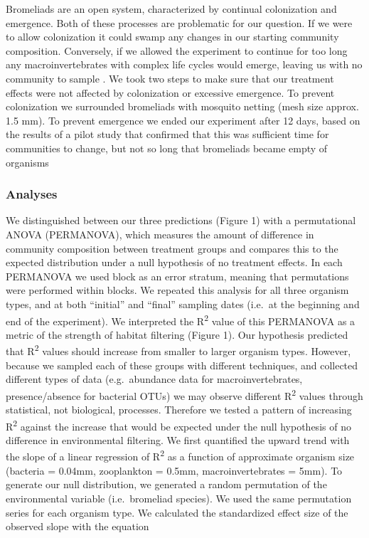 Bromeliads are an open system, characterized by continual colonization
and emergence. Both of these processes are problematic for our question.
If we were to allow colonization it could swamp any changes in our
starting community composition. Conversely, if we allowed the experiment
to continue for too long any macroinvertebrates with complex life cycles
would emerge, leaving us with no community to sample \citep{Lecraw2014}.
We took two steps to make sure that our treatment effects were not
affected by colonization or excessive emergence. To prevent colonization
we surrounded bromeliads with mosquito netting (mesh size approx. 1.5
mm). To prevent emergence we ended our experiment after 12 days, based
on the results of a pilot study that confirmed that this was sufficient
time for communities to change, but not so long that bromeliads became
empty of organisms

\subsubsection{Analyses}\label{analyses}

We distinguished between our three predictions (Figure 1) with a
permutational ANOVA (PERMANOVA), which measures the amount of difference
in community composition between treatment groups and compares this to
the expected distribution under a null hypothesis of no treatment
effects. In each PERMANOVA we used block as an error stratum, meaning
that permutations were performed within blocks. We repeated this
analysis for all three organism types, and at both ``initial'' and
``final'' sampling dates (i.e.~at the beginning and end of the
experiment). We interpreted the R\textsuperscript{2} value of this
PERMANOVA as a metric of the strength of habitat filtering (Figure 1).
Our hypothesis predicted that R\textsuperscript{2} values should
increase from smaller to larger organism types. However, because we
sampled each of these groups with different techniques, and collected
different types of data (e.g.~abundance data for macroinvertebrates,
presence/absence for bacterial OTUs) we may observe different
R\textsuperscript{2} values through statistical, not biological,
processes. Therefore we tested a pattern of increasing
R\textsuperscript{2} against the increase that would be expected under
the null hypothesis of no difference in environmental filtering. We
first quantified the upward trend with the slope of a linear regression
of R\textsuperscript{2} as a function of approximate organism size
(bacteria = 0.04mm, zooplankton = 0.5mm, macroinvertebrates = 5mm). To
generate our null distribution, we generated a random permutation of the
environmental variable (i.e.~bromeliad species). We used the same
permutation series for each organism type. We calculated the
standardized effect size of the observed slope with the equation

